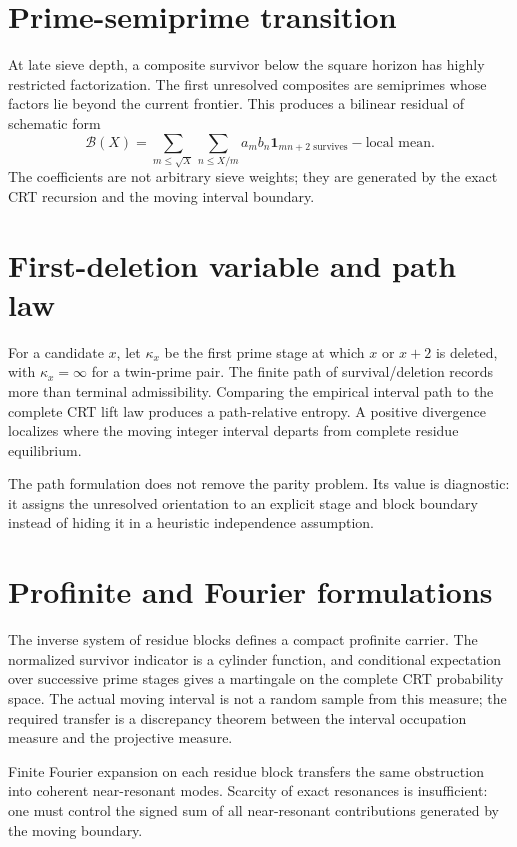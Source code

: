 \documentclass[11pt,a4paper]{article}
\begin{document}
\section{Prime-semiprime transition}
At late sieve depth, a composite survivor below the square horizon has highly restricted factorization. The first unresolved composites are semiprimes whose factors lie beyond the current frontier. This produces a bilinear residual of schematic form
\begin{equation}
\mathcal B(X)=\sum_{m\le\sqrt X}\sum_{n\le X/m}a_mb_n
\mathbf1_{mn+2\text{ survives}}-\text{local mean}.
\end{equation}
The coefficients are not arbitrary sieve weights; they are generated by the exact CRT recursion and the moving interval boundary.

\section{First-deletion variable and path law}
For a candidate $x$, let $\kappa_x$ be the first prime stage at which $x$ or $x+2$ is deleted, with $\kappa_x=\infty$ for a twin-prime pair. The finite path of survival/deletion records more than terminal admissibility. Comparing the empirical interval path to the complete CRT lift law produces a path-relative entropy. A positive divergence localizes where the moving integer interval departs from complete residue equilibrium.

The path formulation does not remove the parity problem. Its value is diagnostic: it assigns the unresolved orientation to an explicit stage and block boundary instead of hiding it in a heuristic independence assumption.

\section{Profinite and Fourier formulations}
The inverse system of residue blocks defines a compact profinite carrier. The normalized survivor indicator is a cylinder function, and conditional expectation over successive prime stages gives a martingale on the complete CRT probability space. The actual moving interval is not a random sample from this measure; the required transfer is a discrepancy theorem between the interval occupation measure and the projective measure.

Finite Fourier expansion on each residue block transfers the same obstruction into coherent near-resonant modes. Scarcity of exact resonances is insufficient: one must control the signed sum of all near-resonant contributions generated by the moving boundary.
\end{document}
